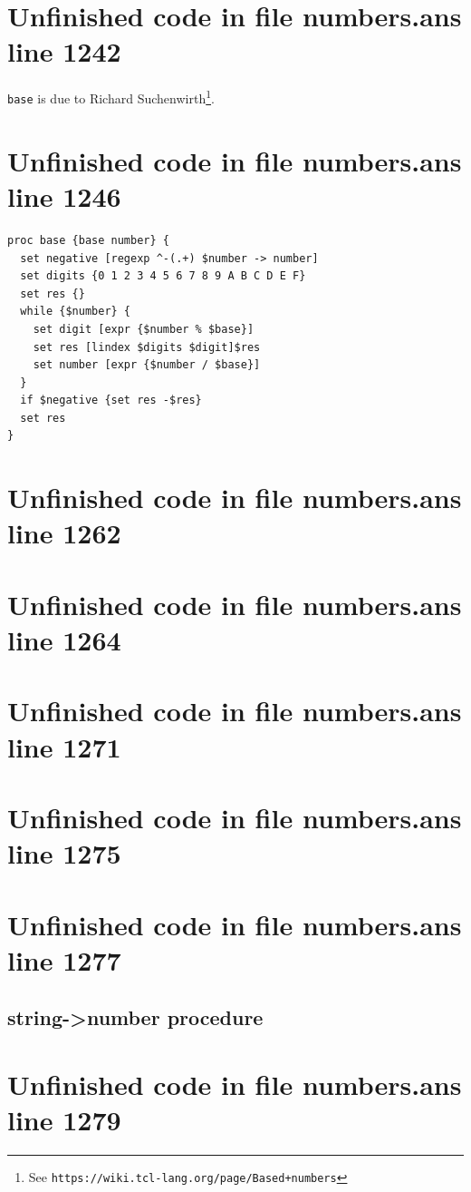 \documentclass[twoside,9pt]{report}
\begin{document}
\section{Unfinished code in file numbers.ans line 1242}


\texttt{base} is due to Richard Suchenwirth\footnote{See \texttt{https://wiki.tcl-lang.org/page/Based+numbers}}.

\section{Unfinished code in file numbers.ans line 1246}
\begin{lstlisting}
proc base {base number} {
  set negative [regexp ^-(.+) $number -> number]
  set digits {0 1 2 3 4 5 6 7 8 9 A B C D E F}
  set res {}
  while {$number} {
    set digit [expr {$number % $base}]
    set res [lindex $digits $digit]$res
    set number [expr {$number / $base}]
  }
  if $negative {set res -$res}
  set res
}
\end{lstlisting}
\section{Unfinished code in file numbers.ans line 1262}
\section{Unfinished code in file numbers.ans line 1264}
\section{Unfinished code in file numbers.ans line 1271}
\section{Unfinished code in file numbers.ans line 1275}
\section{Unfinished code in file numbers.ans line 1277}
\subsection{string->number procedure}
\label{string->number-procedure}
\section{Unfinished code in file numbers.ans line 1279}
\end{document}
